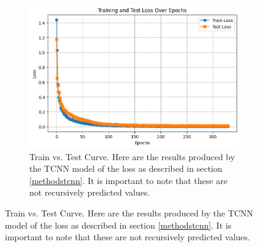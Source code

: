 \documentclass[conference]{IEEEtran}
\begin{document}
\begin{figure}[H]  %
    \begin{subfigure}{0.45\textwidth}  %
        \centering
        \includegraphics[scale=1]{pictures/train_test_curve.png}
        \caption{Train vs. Test Curve. Here are the results produced by the TCNN model of the loss 
        as described in section \ref{methodstcnn}. It is important to note that these are not 
        recursively predicted values.}
        \label{fig:train_test_curve}
    \end{subfigure}
\end{figure}

\newpage
\end{document}
